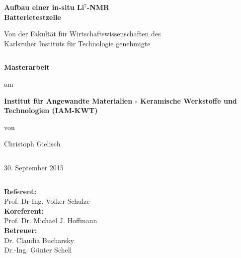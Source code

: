 \documentclass[a4paper, 11pt, headsepline,footsepline,twoside,abstract]{scrbook}
\begin{document}
\begin{center}
\textbf{\huge{ Aufbau einer in-situ Li$^7$-NMR\\[0.4cm]Batterietestzelle}}
\end{center}
\begin{center}
\large{}
\end{center}
\begin{center}
\textbf{\Large{}}
\end{center}
\begin{center}
\large{Von der Fakultät für Wirtschaftswissenschaften des \\ Karlsruher Instituts für Technologie genehmigte }
\end{center}
\begin{verbatim}

\end{verbatim}
\begin{center}
\textbf{\LARGE{Masterarbeit}}
\end{center}
\begin{center}
am
\end{center}
\begin{center}
\textbf{\Large{Institut für Angewandte Materialien - Keramische Werkstoffe und Technologien (IAM-KWT)}}
\end{center}
\begin{center}
von
\end{center}
\begin{center}
\Large{Christoph Gielisch}
\end{center}
\begin{verbatim}

\end{verbatim}
\begin{center}
30. September 2015
\end{center}
\begin{verbatim}

\end{verbatim}
\begin{center}
\textbf{Referent:} \\ Prof. Dr-Ing. Volker Schulze \\
\textbf{Koreferent:} \\ Prof. Dr. Michael J. Hoffmann\\
\textbf{Betreuer:} \\ Dr. Claudia Bucharsky \\ 
Dr.-Ing. Günter Schell \\
\end{center}
\newpage
\end{document}
